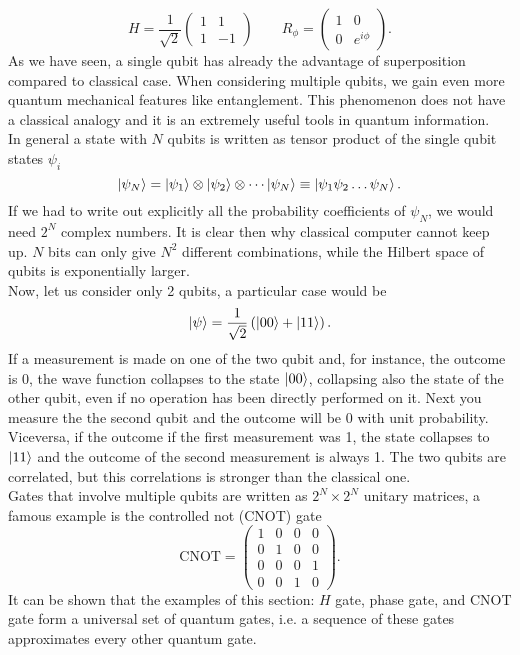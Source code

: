 \begin{equation}
\label{Hadamard}
 H = \frac{1}{\sqrt{2}}\begin{pmatrix}
 1  & 1\\
1 & -1
 \end{pmatrix} \qquad R_\phi = \begin{pmatrix}
 1  & 0\\
0 & e^{i\phi}
 \end{pmatrix}.
\end{equation}
As we have seen, a single qubit has already the advantage of superposition compared to classical case. When considering multiple qubits, we gain even more quantum mechanical features like entanglement. This phenomenon does not have a classical analogy and it is an extremely useful tools in quantum information.\\
In general a state with $N$ qubits is written as tensor product of the single qubit states $\psi_i$
\begin{equation}
\ket{\psi_N} = \ket{\psi_1}\otimes \ket{\psi_2}\otimes \cdots \ket{\psi_N} \equiv \ket{\psi_1\psi_2\dots \psi_N}.
\end{equation}
If we had to write out explicitly all the probability coefficients of $\psi_N$, we would need $2^N$ complex numbers. It is clear then why classical computer cannot keep up. $N$ bits can only give $N^2$ different combinations, while the Hilbert space of qubits is exponentially larger.\\
Now, let us consider only 2 qubits, a particular case would be
\begin{equation}
\ket{\psi} = \frac{1}{\sqrt{2}}\left(\ket{00} + \ket{11}\right).
\end{equation}
If a measurement is made on one of the two qubit and, for instance, the outcome is 0, the wave function collapses to the state $\ket{00}$, collapsing also the state of the other qubit, even if no operation has been directly performed on it. Next you measure the the second qubit and the outcome will be 0 with unit probability. Viceversa, if the outcome if the first measurement was 1, the state collapses to $\ket{11}$ and the outcome of the second measurement is always 1. The two qubits are correlated, but this correlations is stronger than the classical one.\\
Gates that involve multiple qubits are written as $2^N\times 2^N$ unitary matrices, a famous example is the controlled not (CNOT) gate
\begin{equation}
\text{CNOT} = \begin{pmatrix}
1  & 0 & 0 & 0\\
0 & 1 & 0 & 0\\
0 & 0& 0 & 1 \\
0 & 0 & 1 &0
\end{pmatrix}.
\end{equation}
It can be shown \cite{chuang} that the examples of this section: $H$ gate, phase gate, and CNOT gate form a universal set of quantum gates, i.e. a sequence of these gates approximates every other quantum gate.

